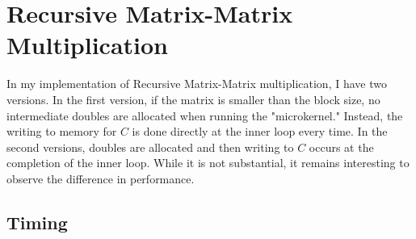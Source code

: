 \documentclass{article}
\begin{document}
\section{Recursive Matrix-Matrix Multiplication}

In my implementation of Recursive Matrix-Matrix multiplication, I have two versions. In the first version, if the matrix is smaller than the block size, no intermediate doubles are allocated when running the "microkernel." Instead, the writing to memory for \(C \) is done directly at the inner loop every time. In the second versions, doubles are allocated and then writing to \(C \) occurs at the completion of the inner loop. While it is not substantial, it remains interesting to observe the difference in performance. 

\subsection{Timing}
\begin{table}[ht!]
    \caption{Recursive Matrix-Matrix Multiplication Timings (Seconds) on NOTS}
    \centering
\end{table}
\end{document}
